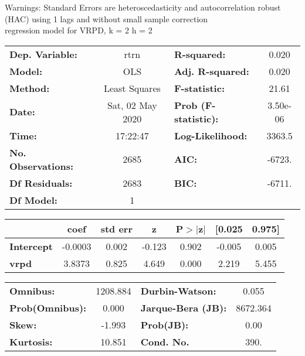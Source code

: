 Warnings: \newline
 [1] Standard Errors are heteroscedasticity and autocorrelation robust (HAC) using 1 lags and without small sample correction\\ 

regression model for VRPD, k = 2 h = 2\begin{center}
\begin{tabular}{lclc}
\toprule
\textbf{Dep. Variable:}    &       rtrn       & \textbf{  R-squared:         } &     0.020   \\
\textbf{Model:}            &       OLS        & \textbf{  Adj. R-squared:    } &     0.020   \\
\textbf{Method:}           &  Least Squares   & \textbf{  F-statistic:       } &     21.61   \\
\textbf{Date:}             & Sat, 02 May 2020 & \textbf{  Prob (F-statistic):} &  3.50e-06   \\
\textbf{Time:}             &     17:22:47     & \textbf{  Log-Likelihood:    } &    3363.5   \\
\textbf{No. Observations:} &        2685      & \textbf{  AIC:               } &    -6723.   \\
\textbf{Df Residuals:}     &        2683      & \textbf{  BIC:               } &    -6711.   \\
\textbf{Df Model:}         &           1      & \textbf{                     } &             \\
\bottomrule
\end{tabular}
\begin{tabular}{lcccccc}
                   & \textbf{coef} & \textbf{std err} & \textbf{z} & \textbf{P$> |$z$|$} & \textbf{[0.025} & \textbf{0.975]}  \\
\midrule
\textbf{Intercept} &      -0.0003  &        0.002     &    -0.123  &         0.902        &       -0.005    &        0.005     \\
\textbf{vrpd}      &       3.8373  &        0.825     &     4.649  &         0.000        &        2.219    &        5.455     \\
\bottomrule
\end{tabular}
\begin{tabular}{lclc}
\textbf{Omnibus:}       & 1208.884 & \textbf{  Durbin-Watson:     } &    0.055  \\
\textbf{Prob(Omnibus):} &   0.000  & \textbf{  Jarque-Bera (JB):  } & 8672.364  \\
\textbf{Skew:}          &  -1.993  & \textbf{  Prob(JB):          } &     0.00  \\
\textbf{Kurtosis:}      &  10.851  & \textbf{  Cond. No.          } &     390.  \\
\bottomrule
\end{tabular}
\end{center}

